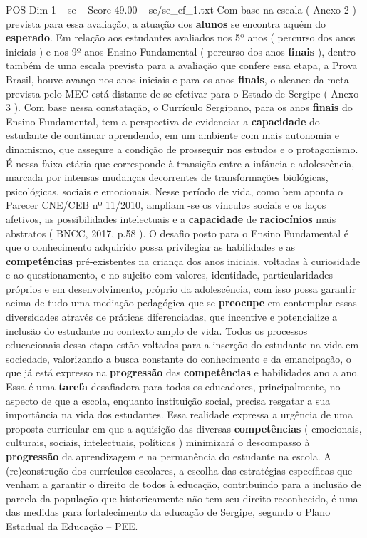 \begin{textsample}{POS Dim 1 – se – Score 49.00 – se/se\_ef\_1.txt}
Com base na escala ( Anexo 2 ) prevista para essa avaliação, a atuação dos \textbf{alunos} se encontra aquém do \textbf{esperado}.
Em relação aos estudantes avaliados nos 5º anos ( percurso dos anos iniciais ) e nos 9º anos Ensino Fundamental ( percurso dos anos \textbf{finais} ), dentro também de uma escala prevista para a avaliação que confere essa etapa, a Prova Brasil, houve avanço nos anos iniciais e para os anos \textbf{finais}, o alcance da meta prevista pelo MEC está distante de se efetivar para o Estado de Sergipe ( Anexo 3 ).
Com base nessa constatação, o Currículo Sergipano, para os anos \textbf{finais} do Ensino Fundamental, tem a perspectiva de evidenciar a \textbf{capacidade} do estudante de continuar aprendendo, em um ambiente com mais autonomia e dinamismo, que assegure a condição de prosseguir nos estudos e o protagonismo.
É nessa faixa etária que corresponde à transição entre a infância e adolescência, marcada por intensas mudanças decorrentes de transformações biológicas, psicológicas, sociais e emocionais.
Nesse período de vida, como bem aponta o Parecer CNE/CEB nº 11/2010, ampliam -se os vínculos sociais e os laços afetivos, as possibilidades intelectuais e a \textbf{capacidade} de \textbf{raciocínios} mais abstratos ( BNCC, 2017, p.58 ).
O desafio posto para o Ensino Fundamental é que o conhecimento adquirido possa privilegiar as habilidades e as \textbf{competências} pré-existentes na criança dos anos iniciais, voltadas à curiosidade e ao questionamento, e no sujeito com valores, identidade, particularidades próprios e em desenvolvimento, próprio da adolescência, com isso possa garantir acima de tudo uma mediação pedagógica que se \textbf{preocupe} em contemplar essas diversidades através de práticas diferenciadas, que incentive e potencialize a inclusão do estudante no contexto amplo de vida.
Todos os processos educacionais dessa etapa estão voltados para a inserção do estudante na vida em sociedade, valorizando a busca constante do conhecimento e da emancipação, o que já está expresso na \textbf{progressão} das \textbf{competências} e habilidades ano a ano.
Essa é uma \textbf{tarefa} desafiadora para todos os educadores, principalmente, no aspecto de que a escola, enquanto instituição social, precisa resgatar a sua importância na vida dos estudantes.
Essa realidade expressa a urgência de uma proposta curricular em que a aquisição das diversas \textbf{competências} ( emocionais, culturais, sociais, intelectuais, políticas ) minimizará o descompasso à \textbf{progressão} da aprendizagem e na permanência do estudante na escola.
A (re)construção dos currículos escolares, a escolha das estratégias específicas que venham a garantir o direito de todos à educação, contribuindo para a inclusão de parcela da população que historicamente não tem seu direito reconhecido, é uma das medidas para fortalecimento da educação de Sergipe, segundo o Plano Estadual da Educação – PEE.

\end{textsample}
